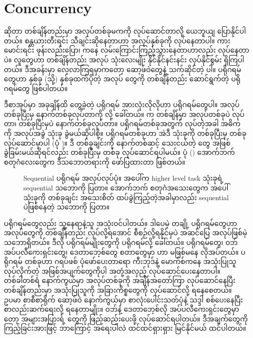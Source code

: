 \chapter{Concurrency}\label{ch:concurrency}


 ဆိုတာ တစ်ချိန်တည်းမှာ အလုပ်တစ်ခုမကကို လုပ်ဆောင်တာလို့ ယေဘူယျ ပြောနိုင်ပါတယ်။ စန္တယားတီးရင်း သီချင်းဆိုနေတာဟာ အလုပ်နှစ်ခုကို  လုပ်နေတာပါ။ ကားမောင်းရင်း ဖုန်းလည်းပြော၊  ကနေ လမ်းကြောင်းကြည့်သွားနေတာဟာလည်း  လုပ်နေတာပဲ။ လူတွေဟာ တစ်ချိန်တည်း အလုပ် သုံးလေးမျိုး နိုင်နိုင်နင်းနင်း လုပ်နိုင်စွမ်း ရှိကြပါတယ်။ ဒီအခန်းမှာ လေ့လာကြရမှာကတော့ ဆော့ဖ်ဝဲတွေနဲ့ သက်ဆိုင်တဲ့  ပါ။  ပရိုဂရမ်တွေဟာ နှစ်ခု (သို့) နှစ်ခုထက်ပိုတဲ့ အလုပ်  တွေကို တစ်ချိန်တည်း ဆောင်ရွက်တဲ့ ပရိုဂရမ်တွေ ဖြစ်ပါတယ်။ 

ဒီစာအုပ်မှာ အခုချိန်ထိ တွေ့ခဲ့တဲ့ ပရိုဂရမ် အားလုံးလိုလိုဟာ  ပရိုဂရမ်တွေပါ။ အလုပ် တစ်ခုပြီးမှ နောက်တစ်ခုလုပ်တာကို  လို့ ခေါ်တယ်။  က တစ်ချိန်မှာ အလုပ်တစ်ခုပဲ လုပ်တာ၊ တစ်ခုပြီးမှပဲ နောက်တစ်ခုလုပ်တာ။ ပရိုဂရမ်တစ်ခုအတွက်  လုပ်တဲ့အခါ အဓိက  ကို အလုပ်အခွဲ  သုံးခု ခွဲမယ်ဆိုပါစို့။  ပရိုဂရမ်တစ်ခုဟာ အဲဒီ  သုံးခုကို တစ်ခုပြီးမှ တစ်ခု လုပ်ဆောင်မှာပါ (ပုံ )။ ဒီ  တစ်ခုချင်းကို နောက်တစ်ဆင့် သေးငယ်တဲ့  တွေ အဖြစ် ခွဲခြမ်းမယ်ဆိုရင်လည်း တစ်ခုပြီးမှ တစ်ခု လုပ်ဆောင်ရပါမယ်။ ပုံ (\fRefNo{\ref{fig:sequential}}) အောက်ဘက် စတုဂံလေးတွေက ဒီသဘောတရားကို ဖော်ပြထားတာ ဖြစ်တယ်။
\begin{figure}[H]
    \caption{Sequential ပရိုဂရမ် အလုပ်လုပ်ပုံ။ အပေါ်က higher level task သုံးခုရဲ့ sequential သဘောကို ပြတာ။ အောက်ဘက် စတုဂံအသေးတွေက အပေါ်သုံးခုကို တစ်ခုချင်း အသေးစိတ် ထပ်ခွဲကြည့်တဲ့အခါမှာလည်း sequential ပဲဖြစ်နေတဲ့ သဘောကို ပြတာ။}
    \label{fig:sequential}
\end{figure}

 ပရိုဂရမ်တွေလည်း သူ့နေရာနဲ့သူ အသုံးဝင်ပါတယ်။ ဒါပေမဲ့ တချို့ ပရိုဂရမ်တွေဟာ အလုပ်တွေကို တစ်ချိန်တည်း လုပ်လို့ရအောင် စီစဉ်လို့ရနိုင်မှပဲ အဆင်ပြေ အလုပ်ဖြစ်မဲ့ သဘောရှိတယ်။ ဒီလို ပရိုဂရမ်မျိုးတွေကို  ပရိုဂရမ်လို့ ခေါ်တယ်။  ပရိုဂရမ်တွေ၊ ဝဘ်အပ်ပလီကေးရှင်းတွေ၊ ဒေတာဘေ့စ်တွေ စတာတွေမှာ  ဟာ မဖြစ်မနေ လိုအပ်တယ်။  ပရိုဂရမ် တစ်ခုဟာ ဂရပ်ဖစ် ပုံဖော်ပေးတာရော ကီးဘုဒ်နဲ့ မောက်စ်ကနေ အသုံးပြုသူ လုပ်လိုက်တဲ့ အဖြစ်အပျက်တွေကိုပါ အတုံ့အလှည့် လုပ်ဆောင်ပေးနေတာပါ။ တစ်ခါတစ်ရံ နောက်ကွယ်မှာ အလုပ်တစ်ခုကို အချိန်အတော်ကြာ လုပ်ဆောင်နေပြီး တစ်ချိန်တည်းမှာ အသုံးပြုသူကို အခြားကိစ္စတွေကို လုပ်ဆောင်လို့ ရနေစေတယ်။ ဥပမာ စာစီစာရိုက် ဆော့ဖ်ဝဲ နောက်ကွယ်မှာ စာလုံးပေါင်းသတ်ပုံနဲ့ သဒ္ဒါ စစ်ပေးနေပြီး စာလည်းဆက်ရေးလို့ ရနေတာမျိုး။ ဝဘ်နဲ့ ဒေတာဘေ့စ်လို  အပ်ပလီကေးရှင်းတွေမှာတော့  အများအပြားရဲ့  တွေကို ဖြည့်ဆည်းပေးဖို့ လုပ်ဆောင်ရပါတယ်။ ဒီအချက်တွေကို ကြည့်ခြင်းအားဖြင့် ဘာကြောင့်  အရေးပါလဲ ထင်ထင်ရှားရှား မြင်နိုင်မယ် ထင်ပါတယ်။

